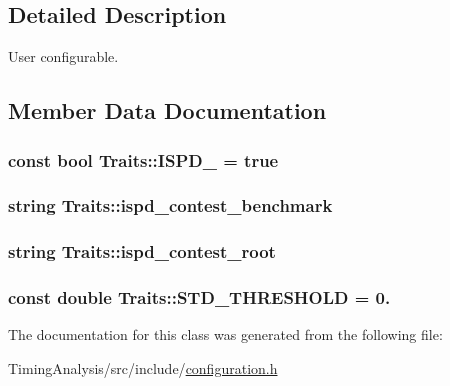 \subsection{Detailed Description}
User configurable. 

\subsection{Member Data Documentation}
\hypertarget{classTraits_a6be4a9876454c3e6e139e7d213a74884}{
\subsubsection[{I\-S\-P\-D\-\_\-2012}]{\setlength{\rightskip}{0pt plus 5cm}const bool Traits\-::\-I\-S\-P\-D\-\_ = true\hspace{0.3cm}{\ttfamily [static]}}}\label{classTraits_a6be4a9876454c3e6e139e7d213a74884}
\hypertarget{classTraits_af167fe41eea5cdd9e190a0807f39b3f4}{
\subsubsection[{ispd\-\_\-contest\-\_\-benchmark}]{\setlength{\rightskip}{0pt plus 5cm}string Traits\-::ispd\-\_\-contest\-\_\-benchmark\hspace{0.3cm}{\ttfamily [static]}}}\label{classTraits_af167fe41eea5cdd9e190a0807f39b3f4}
\hypertarget{classTraits_a418b8b76f68ab0a74e58119f32330547}{
\subsubsection[{ispd\-\_\-contest\-\_\-root}]{\setlength{\rightskip}{0pt plus 5cm}string Traits\-::ispd\-\_\-contest\-\_\-root\hspace{0.3cm}{\ttfamily [static]}}}\label{classTraits_a418b8b76f68ab0a74e58119f32330547}
\hypertarget{classTraits_ab7f403f849da178fd4c1995084f3709b}{
\subsubsection[{S\-T\-D\-\_\-\-T\-H\-R\-E\-S\-H\-O\-L\-D}]{\setlength{\rightskip}{0pt plus 5cm}const double Traits\-::\-S\-T\-D\-\_\-\-T\-H\-R\-E\-S\-H\-O\-L\-D = 0.\hspace{0.3cm}{\ttfamily [static]}}}\label{classTraits_ab7f403f849da178fd4c1995084f3709b}


The documentation for this class was generated from the following file\-:\begin{DoxyCompactItemize}
\item 
Timing\-Analysis/src/include/\hyperlink{configuration_8h}{configuration.\-h}\end{DoxyCompactItemize}
